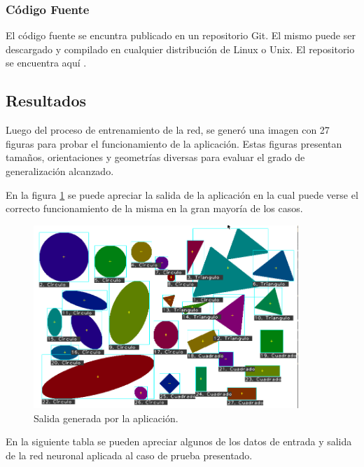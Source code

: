 \documentclass[pdftex,a4paper,10.5pt]{article}
\begin{document}
\subsubsection{C\'odigo Fuente}
	El c\'odigo fuente se encuntra publicado en un repositorio Git. El mismo puede
	ser descargado y compilado en cualquier distribuci\'on de Linux o Unix. El
	repositorio se encuentra aqu\'i \cite{repo}.

\subsection{Resultados} %

Luego del proceso de entrenamiento de la red, se gener\'o una imagen con 27 figuras para probar el funcionamiento de la aplicaci\'on. Estas figuras presentan tama\~nos, orientaciones y geometr\'ias diversas para evaluar el grado de generalizaci\'on alcanzado.

En la figura \ref{salida_ejemlpo} se puede apreciar la salida de la aplicaci\'on en la cual puede verse el correcto funcionamiento de la misma en la gran mayor\'ia de los casos.

 	           \begin{figure}[H]

	                  \begin{center}
	                    \includegraphics[width=10cm]{salida.png}
	                    \caption{\label{salida_ejemlpo} Salida generada por la aplicaci\'on. }
	                  \end{center}
	            \end{figure}


En la siguiente tabla se pueden apreciar algunos de los datos de entrada y salida de la red neuronal aplicada al caso de prueba presentado.
\end{document}
